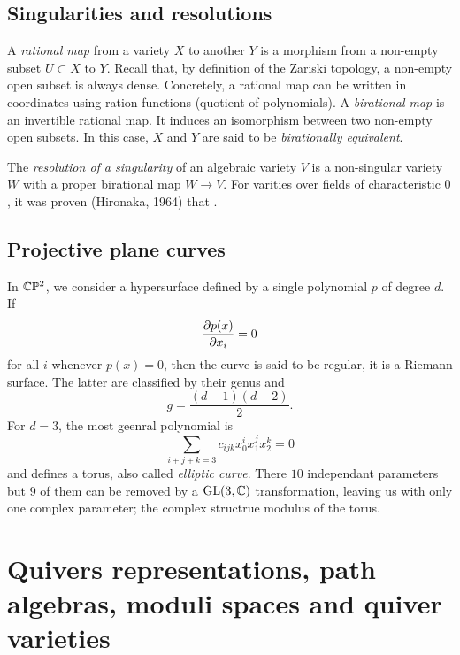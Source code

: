     \subsection{Singularities and resolutions}

        A \emph{rational map} from a variety $X$ to another $Y$ is a morphism from a non-empty subset $U\subset X$ to $Y$. Recall that, by definition of the Zariski topology, a non-empty open subset is always dense. Concretely, a rational map can be written in coordinates using ration functions (quotient of polynomials). A \emph{birational map} is an invertible rational map. It induces an isomorphism between two non-empty open subsets. In this case, $X$ and $Y$ are said to be \emph{birationally equivalent}.

        The \emph{resolution of a singularity} of an algebraic variety $V$ is a non-singular variety $W$ with a proper birational map $W\to V$. For varities over fields of characteristic $0$, it was proven (Hironaka, 1964) that .

    \subsection{Projective plane curves}

        In $\mathbb{C}\mathbb{P}^2$, we consider a hypersurface defined by a single polynomial $p$ of degree $d$. If
        \begin{equation}
            \pdv{p(x)}{x_i}=0
        \end{equation}
        for all $i$ whenever $p(x)=0$, then the curve is said to be regular, it is a Riemann surface. The latter are classified by their genus and
        \begin{equation}
            g=\frac{(d-1)(d-2)}{2}.
        \end{equation}
        For $d=3$, the most geenral polynomial is
        \begin{equation}
            \sum_{i+j+k=3}c_{ijk}x^i_0x^j_1x^k_2=0
        \end{equation}
        and defines a torus, also called \emph{elliptic curve}. There $10$ independant parameters but $9$ of them can be removed by a $\text{GL}(3,\mathbb{C})$ transformation, leaving us with only one complex parameter; the complex structrue modulus of the torus.

\section{Quivers representations, path algebras, moduli spaces and quiver varieties}

